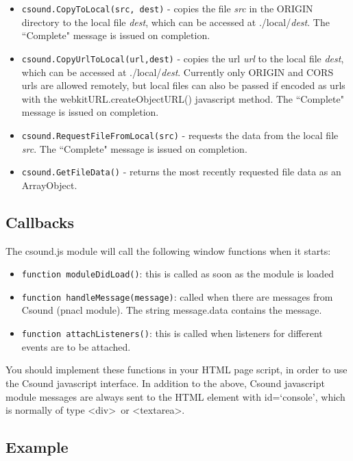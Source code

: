 \documentclass[11pt]{article}
\begin{document}
\begin{itemize}
\item {\tt csound.CopyToLocal(src, dest)} - copies the file \emph{src} in the ORIGIN directory to the local file \emph{dest}, which can
be accessed at ./local/\emph{dest}. The ``Complete" message is issued on completion.
\item {\tt csound.CopyUrlToLocal(url,dest)} - copies the url \emph{url} to the local file \emph{dest}, which can
be accessed at ./local/\emph{dest}. Currently only ORIGIN and CORS urls are allowed remotely, but local files can
also be passed if encoded as urls with the webkitURL.createObjectURL() javascript method. The ``Complete" message is issued on completion.
\item {\tt csound.RequestFileFromLocal(src)} - requests the data from the local file \emph{src}. The ``Complete" message is issued on completion. 
\item {\tt csound.GetFileData()} - returns the most recently requested file data as an ArrayObject.
\end{itemize}


\subsection{Callbacks}

The csound.js module will call the following window functions when it starts:

\begin{itemize} 
\item {\tt function moduleDidLoad()}: this is called as soon as the module is loaded 
\item {\tt function handleMessage(message)}: called when there are messages from Csound (pnacl module). 
The string message.data contains the message.
\item {\tt function attachListeners()}: this is called when listeners for different events are to be attached. 
\end{itemize}

You should implement these functions in your HTML page script, in order to use the Csound javascript interface.
In addition to the above, Csound javascript module messages are always sent to the HTML element with id=`console', 
which is normally of type \textless div\textgreater \, or \textless textarea\textgreater .

\subsection{Example}
\end{document}
